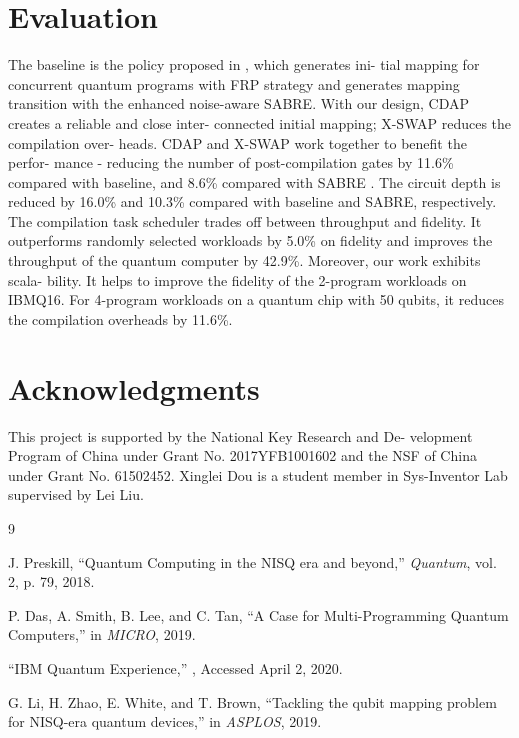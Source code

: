 \documentclass[10pt,twocolumn]{article}
\DeclareRobustCommand{\url}{\begingroup \Url}
\begin{document}
	\section{Evaluation}
	The baseline is the policy proposed in \cite{li2019}, which generates ini-
	tial mapping for concurrent quantum programs with FRP strategy
	and generates mapping transition with the enhanced noise-aware
	SABRE. With our design, CDAP creates a reliable and close inter-
	connected initial mapping; X-SWAP reduces the compilation over-
	heads. CDAP and X-SWAP work together to benefit the perfor-
	mance - reducing the number of post-compilation gates by 11.6\%
	compared with baseline, and 8.6\% compared with SABRE \cite{li2019}. The
	circuit depth is reduced by 16.0\% and 10.3\% compared with baseline
	and SABRE, respectively. The compilation task scheduler trades off
	between throughput and fidelity. It outperforms randomly selected
	workloads by 5.0\% on fidelity and improves the throughput of the
	quantum computer by 42.9\%. Moreover, our work exhibits scala-
	bility. It helps to improve the fidelity of the 2-program workloads
	on IBMQ16. For 4-program workloads on a quantum chip with 50
	qubits, it reduces the compilation overheads by 11.6\%. 
	
	\section*{Acknowledgments}
	This project is supported by the National Key Research and De-
	velopment Program of China under Grant No. 2017YFB1001602
	and the NSF of China under Grant No. 61502452. Xinglei Dou is a
	student member in Sys-Inventor Lab supervised by Lei Liu.
	
	\balance
	\begin{thebibliography}{9}
		
		J. Preskill, ``Quantum Computing in the NISQ era and beyond,'' \textit{Quantum}, vol. 2, p. 79, 2018.
		
		P. Das, A. Smith, B. Lee, and C. Tan, ``A Case for Multi-Programming Quantum Computers,'' in \textit{MICRO}, 2019.
		
		``IBM Quantum Experience,'' \url{https://quantum-computing.ibm.com/}, Accessed April 2, 2020.
		
		G. Li, H. Zhao, E. White, and T. Brown, ``Tackling the qubit mapping problem for NISQ-era quantum devices,'' in \textit{ASPLOS}, 2019.
		
	\end{thebibliography}
\end{document}
